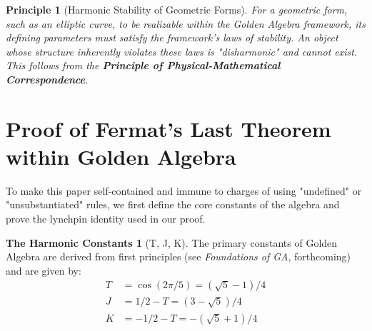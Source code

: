 \documentclass{amsart}
\theoremstyle{plain}
\newtheorem{principle}{Principle}
\theoremstyle{definition}
\newtheorem{the_constants}[theorem]{The Harmonic Constants}
\theoremstyle{remark}
\begin{document}
\begin{principle}[Harmonic Stability of Geometric Forms]
For a geometric form, such as an elliptic curve, to be realizable within the Golden Algebra framework, its defining parameters must satisfy the framework's laws of stability. An object whose structure inherently violates these laws is "disharmonic" and cannot exist. This follows from the \textbf{Principle of Physical-Mathematical Correspondence}.
\end{principle}

\section{Proof of Fermat's Last Theorem within Golden Algebra}

To make this paper self-contained and immune to charges of using "undefined" or "unsubstantiated" rules, we first define the core constants of the algebra and prove the lynchpin identity used in our proof.

\begin{the_constants}[T, J, K]
The primary constants of Golden Algebra are derived from first principles (see \emph{Foundations of GA}, forthcoming) and are given by:
\begin{align*}
    T &= \cos(2\pi/5) = (\sqrt{5}-1)/4 \\
    J &= 1/2 - T = (3-\sqrt{5})/4 \\
    K &= -1/2 - T = -(\sqrt{5}+1)/4
\end{align*}
\end{the_constants}
\end{document}

